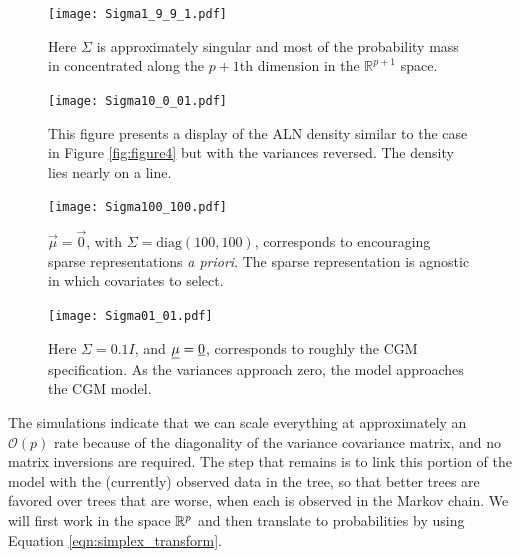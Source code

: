 \begin{figure}[ht]
\begin{minipage}[b]{0.45\linewidth}
\centering
\texttt{[image: Sigma1\_9\_9\_1.pdf]}
\caption[ALN plot $\Sigma$ numerically singular.]{Here $\Sigma$ is approximately singular and most of the probability mass in concentrated along the $p+1$th dimension in the $\mathbb{R}^{p+1}$ space.  }
\label{fig:figure5}
\end{minipage}
\hspace{0.5cm}
\begin{minipage}[b]{0.45\linewidth}
\centering
\texttt{[image: Sigma10\_0\_01.pdf]}
\caption[Similar to the case in Figure \ref{fig:figure4} but with the variances reversed.]{This figure presents a display of the ALN density similar to the case in Figure \ref{fig:figure4} but with the variances reversed. The density lies nearly on a line.}
\label{fig:figure6}
\end{minipage}
\end{figure}

 \begin{figure}[ht]
\begin{minipage}[b]{0.45\linewidth}
\centering
\texttt{[image: Sigma100\_100.pdf]}
\caption[ALN plot with a zero vector mean and $\Sigma=\text{Diag}(100,100)$.]{$\vec{\mu}=\vec{0}$, with
 $\Sigma= \text{diag}(100, 100)$, corresponds to encouraging sparse representations \emph{a priori}. The sparse representation is agnostic in which covariates to select.  }
\label{fig:figure7}
\end{minipage}
\hspace{0.5cm}
\begin{minipage}[b]{0.45\linewidth}
\centering
\texttt{[image: Sigma01\_01.pdf]}
\caption[ALN plot approximating the CGM model.]{Here $\Sigma=0.1I$, and $\underline{\mu}=\underline{{0}}$, corresponds to roughly the CGM specification. As the variances approach zero, the model approaches the CGM model.}
\label{fig:figure8}
\end{minipage}
\end{figure}

 The simulations indicate that we can scale everything at approximately an $\mathcal{O}(p)$ rate because of the diagonality of the variance covariance matrix, and no matrix inversions are required. The step that remains is to link this portion of the model with the (currently) observed data in the tree, so that better trees are favored over trees that are worse, when each is observed in the Markov chain. We will first work in the space $\mathbb{R}^{p}$ and then translate to probabilities by using Equation \ref{eqn:simplex_transform}.  
 
